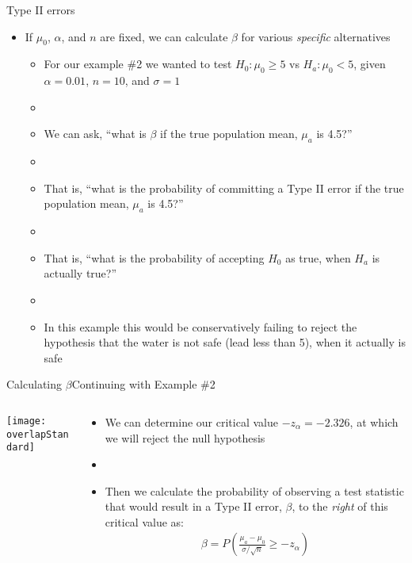 \documentclass[xcolor=dvipsnames]{beamer}
\begin{document}
\begin{frame}{Type II errors}
	\begin{itemize}
		\item If $\mu_0$, $\alpha$, and $n$ are fixed, we can calculate $\beta$ for various \emph{specific} alternatives
		\begin{itemize}
			\item For our example \#2 we wanted to test $H_0: \mu_0 \geq 5$ vs $H_a: \mu_0 < 5$, given $\alpha = 0.01$, $n = 10$, and $\sigma = 1$
			\item[]
			\item We can ask, ``what is $\beta$ if the true population mean, $\mu_a$ is 4.5?'' 
			\item[]
			\item That is, ``what is the probability of committing a Type II error if the true population mean, $\mu_a$ is 4.5?''
			\item[]
			\item That is, ``what is the probability of accepting $H_0$ as true, when $H_a$ is actually true?''
			\item[]
			\item In this example this would be conservatively failing to reject the hypothesis that the water is not safe (lead less than 5), when it actually is safe
		\end{itemize}
	\end{itemize}
\end{frame}

\begin{frame}{Calculating $\beta$}{Continuing with Example \#2}
\begin{columns}
	\begin{column}{.55 \textwidth}
		\begin{center}
			\texttt{[image: overlapStandard]}
		\end{center}
	\end{column}
		\begin{column}{.5 \textwidth}
		\begin{itemize}
			\item We can determine our critical value $-z_{\alpha}= -2.326$, at which we will reject the null hypothesis
			
			\item[]
			
			\item Then we calculate the probability of observing a test statistic that would result in a Type II error, $\beta$, to the \emph{right} of this critical value as:
			\begin{gather*}
			\beta = P \left(\frac{\mu_a - \mu_0}{\sigma / \sqrt{n}} \geq -z_{\alpha} \right)
			\end{gather*}
		\end{itemize}
	\end{column}
\end{columns}
\end{frame}
\end{document}
